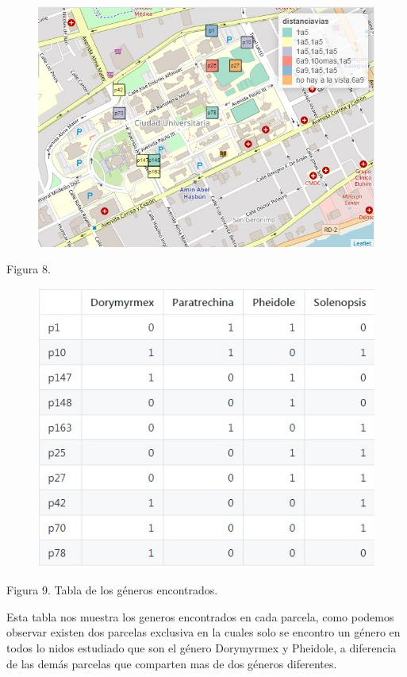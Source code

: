\documentclass[11pt,]{article}
\begin{document}
\begin{figure}
\centering
\includegraphics{distanciavias.jpg}
\caption{}
\end{figure}

Figura 8.

\begin{figure}
\centering
\includegraphics{generos por parcela.jpg}
\caption{}
\end{figure}

Figura 9. Tabla de los géneros encontrados.

Esta tabla nos muestra los generos encontrados en cada parcela, como
podemos observar existen dos parcelas exclusiva en la cuales solo se
encontro un género en todos lo nidos estudiado que son el género
Dorymyrmex y Pheidole, a diferencia de las demás parcelas que comparten
mas de dos géneros diferentes.
\end{document}

